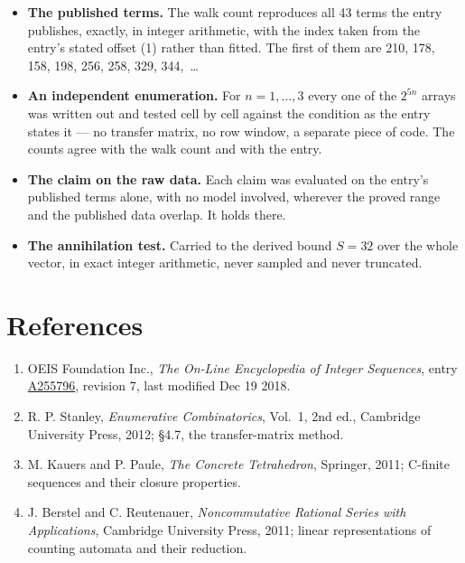 \documentclass[11pt]{article}
\theoremstyle{definition}
\begin{document}
\begin{itemize}

\item {\bfseries The published terms.} The walk count reproduces all 43 terms the entry publishes, exactly, in integer arithmetic, with the index taken from the entry's stated offset (1) rather than fitted. The first of them are 210, 178, 158, 198, 256, 258, 329, 344,~\dots

\item {\bfseries An independent enumeration.} For $n = 1,\dots,3$ every one of the $2^{5n}$ arrays was written out and tested cell by cell against the condition as the entry states it --- no transfer matrix, no row window, a separate piece of code. The counts agree with the walk count and with the entry.

\item {\bfseries The claim on the raw data.} Each claim was evaluated on the entry's published terms alone, with no model involved, wherever the proved range and the published data overlap. It holds there.

\item {\bfseries The annihilation test.} Carried to the derived bound $S = 32$ over the whole vector, in exact integer arithmetic, never sampled and never truncated.

\end{itemize}

\section{References}

\begin{enumerate}

\item OEIS Foundation Inc., \emph{The On-Line Encyclopedia of Integer Sequences}, entry \href{https://oeis.org/A255796}{A255796}, revision 7, last modified Dec 19 2018.

\item R. P. Stanley, \emph{Enumerative Combinatorics}, Vol.~1, 2nd ed., Cambridge University Press, 2012; \S4.7, the transfer-matrix method.

\item M. Kauers and P. Paule, \emph{The Concrete Tetrahedron}, Springer, 2011; C-finite sequences and their closure properties.

\item J. Berstel and C. Reutenauer, \emph{Noncommutative Rational Series with Applications}, Cambridge University Press, 2011; linear representations of counting automata and their reduction.

\end{enumerate}
\end{document}
